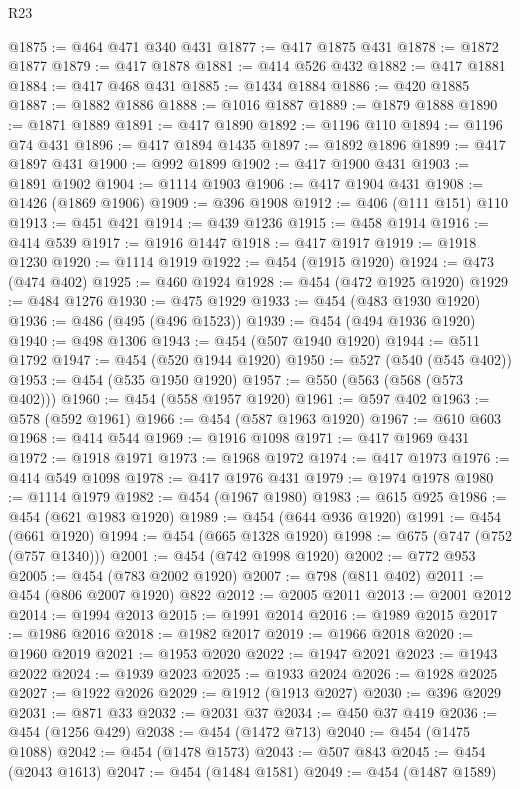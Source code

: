 \begin{lexlean}{R23}
\begin{coremodule}
{{{{{{{{{{{{{{{{{{{{{{{{{{{{{{{{{{{{{{{{{{{{{{{{{{{{{{{{{{{{{{{{{{{{{{{{{{{{{{{{{{{{{{{{{{{{{@1875 := @464 @471 @340 @431
@1877 := @417 @1875 @431
@1878 := @1872 @1877
@1879 := @417 @1878
@1881 := @414 @526 @432
@1882 := @417 @1881
@1884 := @417 @468 @431
@1885 := @1434 @1884
@1886 := @420 @1885
@1887 := @1882 @1886
@1888 := @1016 @1887
@1889 := @1879 @1888
@1890 := @1871 @1889
@1891 := @417 @1890
@1892 := @1196 @110
@1894 := @1196 @74 @431
@1896 := @417 @1894 @1435
@1897 := @1892 @1896
@1899 := @417 @1897 @431
@1900 := @992 @1899
@1902 := @417 @1900 @431
@1903 := @1891 @1902
@1904 := @1114 @1903
@1906 := @417 @1904 @431
@1908 := @1426 (@1869 @1906)
@1909 := @396 @1908
@1912 := @406 (@111 @151) @110
@1913 := @451 @421
@1914 := @439 @1236
@1915 := @458 @1914
@1916 := @414 @539
@1917 := @1916 @1447
@1918 := @417 @1917
@1919 := @1918 @1230
@1920 := @1114 @1919
@1922 := @454 (@1915 @1920)
@1924 := @473 (@474 @402)
@1925 := @460 @1924
@1928 := @454 (@472 @1925 @1920)
@1929 := @484 @1276
@1930 := @475 @1929
@1933 := @454 (@483 @1930 @1920)
@1936 := @486 (@495 (@496 @1523))
@1939 := @454 (@494 @1936 @1920)
@1940 := @498 @1306
@1943 := @454 (@507 @1940 @1920)
@1944 := @511 @1792
@1947 := @454 (@520 @1944 @1920)
@1950 := @527 (@540 (@545 @402))
@1953 := @454 (@535 @1950 @1920)
@1957 := @550 (@563 (@568 (@573 @402)))
@1960 := @454 (@558 @1957 @1920)
@1961 := @597 @402
@1963 := @578 (@592 @1961)
@1966 := @454 (@587 @1963 @1920)
@1967 := @610 @603
@1968 := @414 @544
@1969 := @1916 @1098
@1971 := @417 @1969 @431
@1972 := @1918 @1971
@1973 := @1968 @1972
@1974 := @417 @1973
@1976 := @414 @549 @1098
@1978 := @417 @1976 @431
@1979 := @1974 @1978
@1980 := @1114 @1979
@1982 := @454 (@1967 @1980)
@1983 := @615 @925
@1986 := @454 (@621 @1983 @1920)
@1989 := @454 (@644 @936 @1920)
@1991 := @454 (@661 @1920)
@1994 := @454 (@665 @1328 @1920)
@1998 := @675 (@747 (@752 (@757 @1340)))
@2001 := @454 (@742 @1998 @1920)
@2002 := @772 @953
@2005 := @454 (@783 @2002 @1920)
@2007 := @798 (@811 @402)
@2011 := @454 (@806 @2007 @1920) @822
@2012 := @2005 @2011
@2013 := @2001 @2012
@2014 := @1994 @2013
@2015 := @1991 @2014
@2016 := @1989 @2015
@2017 := @1986 @2016
@2018 := @1982 @2017
@2019 := @1966 @2018
@2020 := @1960 @2019
@2021 := @1953 @2020
@2022 := @1947 @2021
@2023 := @1943 @2022
@2024 := @1939 @2023
@2025 := @1933 @2024
@2026 := @1928 @2025
@2027 := @1922 @2026
@2029 := @1912 (@1913 @2027)
@2030 := @396 @2029
@2031 := @871 @33
@2032 := @2031 @37
@2034 := @450 @37 @419
@2036 := @454 (@1256 @429)
@2038 := @454 (@1472 @713)
@2040 := @454 (@1475 @1088)
@2042 := @454 (@1478 @1573)
@2043 := @507 @843
@2045 := @454 (@2043 @1613)
@2047 := @454 (@1484 @1581)
@2049 := @454 (@1487 @1589)
}}}}}}}}}}}}}}}}}}}}}}}}}}}}}}}}}}}}}}}}}}}}}}}}}}}}}}}}}}}}}}}}}}}}}}}}}}}}}}}}}}}}}}}}}}}}}
\end{coremodule}
\end{lexlean}
